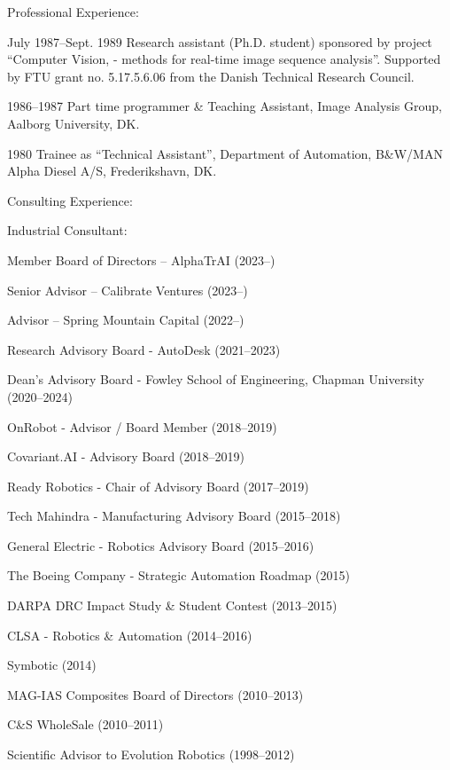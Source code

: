 \documentclass{article}
\newenvironment{sublist}{%
  \begin{list}{}{%
      \setlength{\itemsep}{0em}\setlength{\parsep}{0em}%
      \setlength{\topsep}{0em}\setlength{\parskip}{0em}%
    }%
}%
{ \end{list} }
\begin{document}
\begin{cv}
\begin{cvlist}{Professional Experience:}
\item[July 1987--Sept. 1989] Research assistant (Ph.D. student) sponsored
  by project ``Computer Vision, - methods for real-time image
  sequence analysis''. Supported by FTU grant no. 5.17.5.6.06 from the
  Danish Technical Research Council.

\item[1986--1987] Part time programmer \& Teaching Assistant,
  Image Analysis Group, Aalborg University, DK.

\item[1980] Trainee as ``Technical Assistant'', Department of
  Automation, B\&W/MAN Alpha Diesel A/S, Frederikshavn, DK.\@
\end{cvlist}

\begin{cvlist}{Consulting Experience:}
\item Industrial Consultant:
\begin{sublist}
  \item Member Board of Directors -- AlphaTrAI (2023--)
  \item Senior Advisor -- Calibrate Ventures (2023--)
  \item Advisor -- Spring Mountain Capital (2022--)
  \item Research Advisory Board - AutoDesk (2021--2023)
  \item Dean's Advisory Board - Fowley School of Engineering, Chapman University
  (2020--2024)
  \item OnRobot - Advisor / Board Member (2018--2019)
  \item Covariant.AI - Advisory Board (2018--2019)
  \item Ready Robotics - Chair of Advisory Board (2017--2019)
  \item Tech Mahindra - Manufacturing Advisory Board (2015--2018)
  \item General Electric - Robotics Advisory Board (2015--2016)
  \item The Boeing Company - Strategic Automation Roadmap (2015)
  \item DARPA DRC Impact Study \& Student Contest (2013--2015)
  \item CLSA - Robotics \& Automation (2014--2016)
  \item Symbotic (2014)
  \item MAG-IAS Composites Board of Directors (2010--2013)
  \item C\&S WholeSale (2010--2011)
  \item Scientific Advisor to Evolution Robotics (1998--2012)

\end{sublist}
\end{cvlist}
\end{cv}
\end{document}

